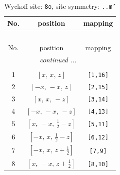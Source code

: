 \documentclass[fleqn,8pt]{jsarticle}
\begin{document}
\begin{longtable}{ccc}
\caption{Wyckoff site: {\tt 8o}, site symmetry: {\tt ..m'}}
 \\
 \hline \hline
No. & position & mapping \\ \hline \endfirsthead

\multicolumn{2}{l}{\tablename\ \thetable{}} \\
 \hline \hline
No. & position & mapping \\ \hline \endhead

 \hline \hline
\multicolumn{2}{r}{\footnotesize\it continued ...} \\ \endfoot

 \hline \hline
\multicolumn{2}{r}{} \\ \endlastfoot

1 & $\left[ x,\, x,\, z \right]$ & {\tt [1,16]} \\ \hline
2 & $\left[ - x,\, - x,\, z \right]$ & {\tt [2,15]} \\ \hline
3 & $\left[ x,\, x,\, - z \right]$ & {\tt [3,14]} \\ \hline
4 & $\left[ - x,\, - x,\, - z \right]$ & {\tt [4,13]} \\ \hline
5 & $\left[ x,\, - x,\, \frac{1}{2} - z \right]$ & {\tt [5,11]} \\ \hline
6 & $\left[ - x,\, x,\, \frac{1}{2} - z \right]$ & {\tt [6,12]} \\ \hline
7 & $\left[ - x,\, x,\, z + \frac{1}{2} \right]$ & {\tt [7,9]} \\ \hline
8 & $\left[ x,\, - x,\, z + \frac{1}{2} \right]$ & {\tt [8,10]} \\
\end{longtable}
\renewcommand{\arraystretch}{1.2}
\end{document}
